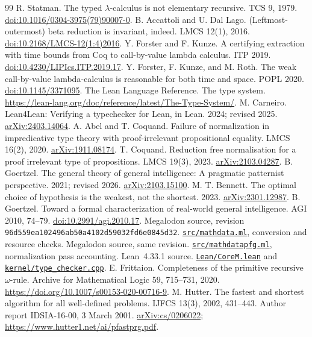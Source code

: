 \documentclass[11pt]{article}
\newcommand{\code}[1]{\nolinkurl{#1}}
\begin{document}
\begin{thebibliography}{99}
 R. Statman. The typed $\lambda$-calculus is not
elementary recursive. TCS 9, 1979.
\href{https://doi.org/10.1016/0304-3975(79)90007-0}{doi:10.1016/0304-3975(79)90007-0}.
 B. Accattoli and U. Dal Lago. (Leftmost-outermost)
beta reduction is invariant, indeed. LMCS 12(1), 2016.
\href{https://doi.org/10.2168/LMCS-12(1:4)2016}{doi:10.2168/LMCS-12(1:4)2016}.
 Y. Forster and F. Kunze. A certifying extraction with
time bounds from Coq to call-by-value lambda calculus. ITP 2019.
\href{https://doi.org/10.4230/LIPIcs.ITP.2019.17}{doi:10.4230/LIPIcs.ITP.2019.17}.
 Y. Forster, F. Kunze, and M. Roth. The weak
call-by-value lambda-calculus is reasonable for both time and space.
POPL 2020. \href{https://doi.org/10.1145/3371095}{doi:10.1145/3371095}.
 The Lean Language Reference. The type system.
\url{https://lean-lang.org/doc/reference/latest/The-Type-System/}.
 M. Carneiro. Lean4Lean: Verifying a typechecker for
Lean, in Lean. 2024; revised 2025.
\href{https://arxiv.org/abs/2403.14064}{arXiv:2403.14064}.
 A. Abel and T. Coquand. Failure of normalization
in impredicative type theory with proof-irrelevant propositional equality.
LMCS 16(2), 2020.
\href{https://arxiv.org/abs/1911.08174}{arXiv:1911.08174}.
 T. Coquand. Reduction free normalisation for a proof
irrelevant type of propositions. LMCS 19(3), 2023.
\href{https://arxiv.org/abs/2103.04287}{arXiv:2103.04287}.
 B. Goertzel. The general theory of general
intelligence: A pragmatic patternist perspective. 2021; revised 2026.
\href{https://arxiv.org/abs/2103.15100}{arXiv:2103.15100}.
 M. T. Bennett. The optimal choice of
hypothesis is the weakest, not the shortest. 2023.
\href{https://arxiv.org/abs/2301.12987}{arXiv:2301.12987}.
 B. Goertzel. Toward a formal
characterization of real-world general intelligence. AGI 2010, 74--79.
\href{https://doi.org/10.2991/agi.2010.17}{doi:10.2991/agi.2010.17}.
 Megalodon source, revision
\code{96d559ea102496ab50a4102d59032fd6e0845d32}.
\href{https://github.com/ai4reason/Megalodon/blob/96d559ea102496ab50a4102d59032fd6e0845d32/src/mathdata.ml}{\code{src/mathdata.ml}}, conversion and resource checks.
 Megalodon source, same revision.
\href{https://github.com/ai4reason/Megalodon/blob/96d559ea102496ab50a4102d59032fd6e0845d32/src/mathdatapfg.ml}{\code{src/mathdatapfg.ml}}, normalization pass accounting.
 Lean~4.33.1 source.
\href{https://github.com/leanprover/lean4/blob/v4.33.1/src/Lean/CoreM.lean}{\code{Lean/CoreM.lean}} and
\href{https://github.com/leanprover/lean4/blob/v4.33.1/src/kernel/type_checker.cpp}{\code{kernel/type_checker.cpp}}.
 E. Frittaion. Completeness of the primitive recursive
$\omega$-rule. Archive for Mathematical Logic 59, 715--731, 2020.
\url{https://doi.org/10.1007/s00153-020-00716-9}.
 M. Hutter. The fastest and shortest algorithm for all
well-defined problems. IJFCS 13(3), 2002, 431--443. Author report
IDSIA-16-00, 3 March 2001.
\href{https://arxiv.org/abs/cs/0206022}{arXiv:cs/0206022};
\url{https://www.hutter1.net/ai/pfastprg.pdf}.
\end{thebibliography}
\end{document}
